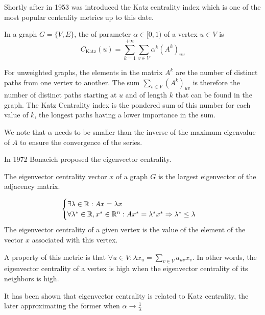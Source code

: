Shortly after in 1953 was introduced the Katz centrality index \cite{katz1953_NewStatusIndex} which is one of the most popular centrality metrics up to this date.

\begin{definition}
    In a graph $G = \{V, E\}$, the  of parameter $\alpha \in [0, 1)$ of a vertex $u \in V$ is
    \begin{equation}
        C_{\text{Katz}}(u) = \sum_{k=1}^{+\infty} \sum_{v\in V} \alpha^k (A^k)_{uv}
    \end{equation}
\end{definition}

For unweighted graphs, the elements in the matrix $A^k$ are the number of distinct paths from one vertex to another. The sum $\sum_{v\in V} (A^k)_{uv}$ is therefore the number of distinct paths starting at $u$ and of length $k$ that can be found in the graph. The Katz Centrality index is the pondered sum of this number for each value of $k$, the longest paths having a lower importance in the sum.

We note that $\alpha$ needs to be smaller than the inverse of the maximum eigenvalue of $A$ to ensure the convergence of the series.

In 1972 Bonacich \cite{bonacich1972_eigenvect_centrality} proposed the eigenvector centrality.
\begin{definition}
    The eigenvector centrality vector $x$ of a graph $G$ is the largest eigenvector of the adjacency matrix.
    
\begin{equation}
    \begin{cases}
        \exists \lambda \in \mathbb{R} : Ax = \lambda x \\
        \forall \lambda^* \in \mathbb{R}, x^* \in \mathbb{R}^n : Ax^* = \lambda^* x^* \Rightarrow \lambda^* \leq \lambda
    \end{cases}
\end{equation}
    The eigenvector centrality of a given vertex is the value of the element of the vector $x$ associated with this vertex.
\end{definition}


A property of this metric is that $\forall u \in V : \lambda x_u = \sum_{v \in V} a_{uv} x_v$. In other words, the eigenvector centrality of a vertex is high when the eigenvector centrality of its neighbors is high.

It has been shown \cite{bonacich2007_UniquePropertiesEigenvector} that eigenvector centrality is related to Katz centrality, the later approximating the former when  $\alpha \to \frac{1}{\lambda}$

